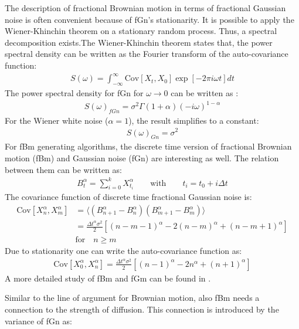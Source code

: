 \documentclass[
  a4paper,BCOR10mm,oneside,
  headsepline,footsepline,%
  fleqn,openbib
]{scrbook}
\begin{document}
The description of fractional Brownian motion in terms of fractional Gaussian noise is often convenient because of fGn's stationarity. It is possible to apply the Wiener-Khinchin theorem on a stationary random process. Thus, a spectral decomposition exists.The Wiener-Khinchin theorem states that, the power spectral density can be written as the Fourier transform of the auto-covariance function:
\begin{align}
 S(\omega)= \int^{\infty}_{-\infty} \mathrm{Cov}[X_t,X_0] \exp[-2 \pi i \omega t] dt
\end{align}
The power spectral density for fGn for $\omega \longrightarrow 0$ can be written as \cite{Hofling2013}:
\begin{align}
 S(\omega)_{fGn}= \sigma^2 \Gamma(1+\alpha) (-i \omega)^{1-\alpha} \label{powerspec}
\end{align}
For the Wiener white noise ($\alpha=1$), the result simplifies to a constant:
\begin{align}
 S(\omega)_{Gn} = \sigma^2 
\end{align}
For fBm generating algorithms, the discrete time version of fractional Brownian motion (fBm) and Gaussian noise (fGn) are interesting as well. The relation between them can be written as:
\begin{align}
B^{\alpha}_{t}= \sum_{i=0}^kX^{\alpha}_{t_i} \qquad \text{with} \qquad t_i= t_0+i \Delta t
\end{align}
The covariance function of discrete time fractional Gaussian noise is:
\begin{align}
 \mathrm{Cov}[X^{\alpha}_n,X^{\alpha}_m]&=\langle (B^{\alpha}_{n+1}-B^{\alpha}_n) (B^{\alpha}_{m+1}-B^{\alpha}_m)\rangle \nonumber \\ &=\frac{\Delta t^{\alpha} \sigma^2}{2}[(n-m-1)^{\alpha}-2(n-m)^{\alpha}+(n-m+1)^{\alpha}]\\ &  \text{for}  \quad n\geq m \nonumber
\end{align}
Due to stationarity one can write the auto-covariance function as:
\begin{align}
 \mathrm{Cov}[X^{\alpha}_0,X^{\alpha}_n]=\frac{\Delta t^{\alpha}\sigma^2}{2}[(n-1)^{\alpha}-2n^{\alpha}+(n+1)^{\alpha}] \label{autocovfgn}
\end{align}
A more detailed study of fBm and fGm can be found in \cite{qian2003fractional}.\par \bigskip Similar to the line of argument for Brownian motion, also fBm needs a connection to the strength of diffusion. This connection is introduced by the variance of fGn as: 
\end{document}
